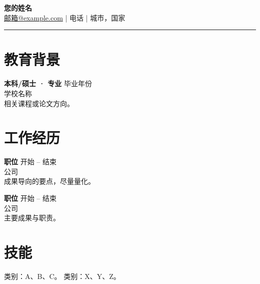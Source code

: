 \documentclass[11pt,a4paper]{article}
\begin{document}
\begin{center}
{\LARGE \textbf{您的姓名}}\\[0.3em]
\href{mailto:邮箱@example.com}{邮箱@example.com} \quad | \quad 电话 \quad | \quad 城市，国家
\end{center}
\begin{flushright}\rule{2cm}{2.5cm}\end{flushright}
\vspace{0.6em}
\section*{教育背景}
\textbf{本科/硕士 · 专业} \hfill 毕业年份 \\
学校名称 \\
相关课程或论文方向。

\section*{工作经历}
\textbf{职位} \hfill 开始 -- 结束 \\
公司 \\
成果导向的要点，尽量量化。

\textbf{职位} \hfill 开始 -- 结束 \\
公司 \\
主要成果与职责。

\section*{技能}
类别：A、B、C。 \quad 类别：X、Y、Z。
\end{document}
